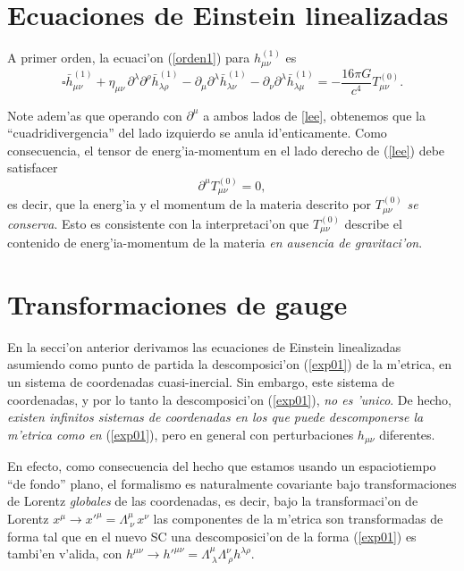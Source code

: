 \section{Ecuaciones de Einstein linealizadas}
A primer orden, la ecuaci'on (\ref{orden1}) para $h^{(1)}_{\mu\nu}$ es
\begin{equation}\label{lee}
\boxed{\square \bar{h}^{(1)}_{\mu\nu}
+\eta_{\mu\nu}\, \partial^\lambda\partial^\rho\bar{h}^{(1)}_{\lambda\rho}-
\partial_\mu\partial^\lambda\bar{h}^{(1)}_{\lambda\nu}
- \partial_\nu\partial^\lambda \bar{h}^{(1)}_{\lambda\mu} =
-\frac{16\pi G}{c^4}T_{\mu\nu}^{(0)} .}
\end{equation}

Note adem'as que operando con $\partial^\mu$ a ambos lados de  \eqref{lee}, obtenemos que la ``cuadridivergencia'' del lado izquierdo se anula id'enticamente. Como consecuencia, el tensor de energ'ia-momentum en el lado derecho de (\ref{lee}) debe satisfacer
\begin{equation}
\partial^\mu T_{\mu\nu}^{(0)}=0, \label{cT0}
\end{equation}
es decir, que la energ'ia y el momentum de la materia descrito por $T_{\mu\nu}^{(0)}$ \textit{se conserva}. Esto es consistente con la interpretaci'on que $T_{\mu\nu}^{(0)}$ describe el contenido de energ'ia-momentum de la materia \textit{en ausencia de gravitaci'on}.


\section{Transformaciones de gauge}
En la secci'on anterior derivamos las ecuaciones de Einstein linealizadas asumiendo como punto de partida la descomposici'on (\ref{exp01}) de la m'etrica, en un sistema de coordenadas cuasi-inercial. Sin embargo, este sistema de coordenadas, y por lo tanto la descomposici'on (\ref{exp01}), \textit{no es 'unico}. De hecho, \textit{existen infinitos sistemas de coordenadas en los que puede descomponerse la m'etrica como en} (\ref{exp01}), pero en general con perturbaciones $h_{\mu\nu}$ diferentes.

En efecto, como consecuencia del hecho que estamos usando un espaciotiempo ``de fondo'' plano, el formalismo es naturalmente covariante bajo
transformaciones de Lorentz \textit{globales} de las coordenadas, es
decir, bajo la transformaci'on de Lorentz $x^\mu\rightarrow x'^\mu=\Lambda^\mu_{\ \nu}\, x^\nu$ las componentes de la m'etrica son transformadas de forma tal que en el nuevo SC una descomposici'on de la forma (\ref{exp01}) es tambi'en v'alida, con $h^{\mu\nu}\to h'^{\mu\nu}=\Lambda^\mu_{\ \lambda}\Lambda^\nu_{\ \rho}h^{\lambda\rho}$.

